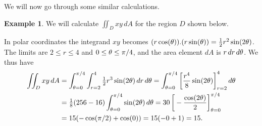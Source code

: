 \documentclass[reqno]{amsart}
\theoremstyle{definition}
\newtheorem{example}[theorem]{Example}
\begin{document}
We will now go through some similar calculations.
\begin{example}
 We will calculate $\iint_D xy\,dA$ for the region $D$ shown below.
 \begin{center}
 \end{center}
 In polar coordinates the integrand $xy$ becomes
 $(r\cos(\theta)).(r\sin(\theta))=\tfrac{1}{2} r^2\sin(2\theta)$.  The limits are
 $2\leq r\leq 4$ and $0\leq\theta\leq\pi/4$, and the area element $dA$
 is $r\,dr\,d\theta$.  We thus have
 \begin{align*}
  \iint_D xy\,dA &=
  \int_{\azi=0}^{\pi/4} \int_{r=2}^4 \half r^3\sin(2\azi)\,dr\,d\azi 
   = \int_{\azi=0}^{\pi/4} \CH{\frac{r^4}{8}\sin(2\azi)}_{r=2}^4 d\azi \\
   &= \tfrac{1}{8}(256-16) \int_{\azi=0}^{\pi/4}\sin(2\azi)\,d\azi 
    = 30 \CH{-\frac{\cos(2\azi)}{2}}_{\azi=0}^{\pi/4} \\
   &= 15(-\cos(\pi/2)+\cos(0)) = 15(-0+1) = 15.
 \end{align*}
\end{example}
\end{document}
